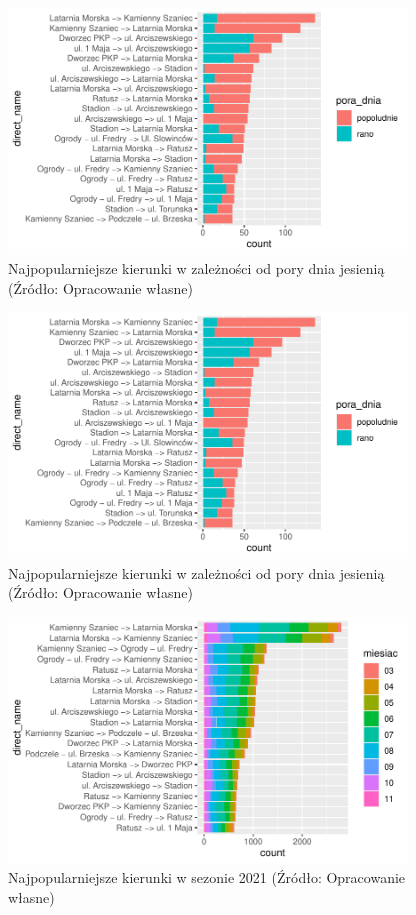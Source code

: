 \documentclass{amuthesis}
\begin{document}
\begin{figure}[t]

{\centering \includegraphics[width=400px]{figures/analiza14-1} 

}

\caption{Najpopularniejsze kierunki w zależności od pory dnia jesienią (Źródło: Opracowanie własne)}\label{fig:analiza14}
\end{figure}
\begin{figure}[t]

{\centering \includegraphics[width=400px]{figures/analiza15-1} 

}

\caption{Najpopularniejsze kierunki w zależności od pory dnia jesienią (Źródło: Opracowanie własne)}\label{fig:analiza15}
\end{figure}

\begin{figure}[t]

{\centering \includegraphics[width=400px]{figures/analiza16-1} 

}

\caption{Najpopularniejsze kierunki w sezonie 2021 (Źródło: Opracowanie własne)}\label{fig:analiza16}
\end{figure}
\end{document}
